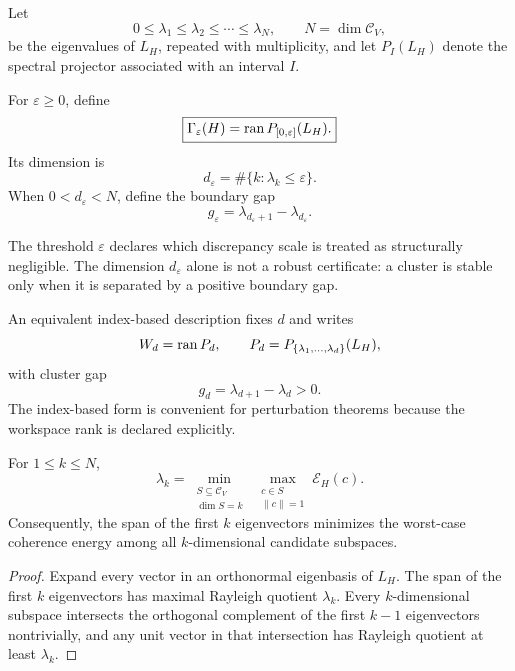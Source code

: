 
Let
\[
0\leq\lambda_1\leq\lambda_2\leq\cdots\leq\lambda_N,
\qquad
N=\dim\mathcal C_V,
\]
be the eigenvalues of \(L_H\), repeated with multiplicity, and let
\(P_I(L_H)\) denote the spectral projector associated with an interval \(I\).

\begin{definition}\label{def:threshold-workspace}
For \(\varepsilon\geq0\), define
\[
\boxed{
\Gamma_\varepsilon(H)
=
\operatorname{ran} P_{[0,\varepsilon]}(L_H).
}
\]
Its dimension is
\[
d_\varepsilon
=
\#\{k:\lambda_k\leq\varepsilon\}.
\]
When \(0<d_\varepsilon<N\), define the boundary gap
\[
\boxed{
g_\varepsilon
=
\lambda_{d_\varepsilon+1}-\lambda_{d_\varepsilon}.
}
\]
\end{definition}

The threshold \(\varepsilon\) declares which discrepancy scale is treated as
structurally negligible. The dimension \(d_\varepsilon\) alone is not a
robust certificate: a cluster is stable only when it is separated by a
positive boundary gap.

An equivalent index-based description fixes \(d\) and writes
\[
W_d=\operatorname{ran} P_d,
\qquad
P_d=P_{\{\lambda_1,\ldots,\lambda_d\}}(L_H),
\]
with cluster gap
\[
g_d=\lambda_{d+1}-\lambda_d>0.
\]
The index-based form is convenient for perturbation theorems because the
workspace rank is declared explicitly.

\begin{proposition}\label{prop:minmax}
For \(1\leq k\leq N\),
\[
\lambda_k
=
\min_{\substack{S\subseteq\mathcal C_V\\\dim S=k}}
\ \max_{\substack{c\in S\\\|c\|=1}}
\mathcal E_H(c).
\]
Consequently, the span of the first \(k\) eigenvectors minimizes the worst-case
coherence energy among all \(k\)-dimensional candidate subspaces.
\end{proposition}

\begin{proof}
Expand every vector in an orthonormal eigenbasis of \(L_H\). The span of the
first \(k\) eigenvectors has maximal Rayleigh quotient \(\lambda_k\). Every
\(k\)-dimensional subspace intersects the orthogonal complement of the first
\(k-1\) eigenvectors nontrivially, and any unit vector in that intersection has
Rayleigh quotient at least \(\lambda_k\).
\end{proof}


